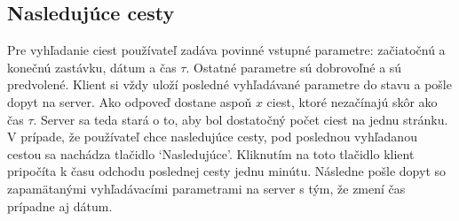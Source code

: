 \subsection{Nasledujúce cesty}
Pre vyhľadanie ciest používateľ zadáva povinné vstupné parametre: začiatočnú a konečnú zastávku, dátum a čas $\tau$. Ostatné parametre sú dobrovoľné a sú predvolené. Klient si vždy uloží posledné vyhľadávané parametre do stavu a pošle dopyt na server. Ako odpoveď  dostane aspoň $x$ ciest, ktoré nezačínajú skôr ako čas $\tau$. Server sa teda stará o to, aby bol dostatočný počet ciest na jednu stránku. V prípade, že používateľ chce nasledujúce cesty, pod poslednou vyhľadanou cestou sa nachádza tlačidlo `Nasledujúce'. Kliknutím na toto tlačidlo klient pripočíta k času odchodu poslednej cesty jednu minútu. Následne pošle dopyt so zapamätanými vyhľadávacími parametrami na server s tým, že zmení čas prípadne aj dátum. 




























